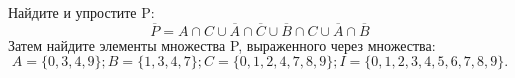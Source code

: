 \question
Найдите и упростите P:
\begin{equation*}
\overline{P} = A \cap C \cup \overline{A} \cap \overline{C} \cup \overline{B} \cap C \cup \overline{A} \cap \overline{B}
\end{equation*}
Затем найдите элементы множества P, выраженного через множества:
\begin{equation*}
A = \{0, 3, 4, 9\}; 
B = \{1, 3, 4, 7\};
C = \{0, 1, 2, 4, 7, 8, 9\};
I = \{0, 1, 2, 3, 4, 5, 6, 7, 8, 9\}.
\end{equation*}